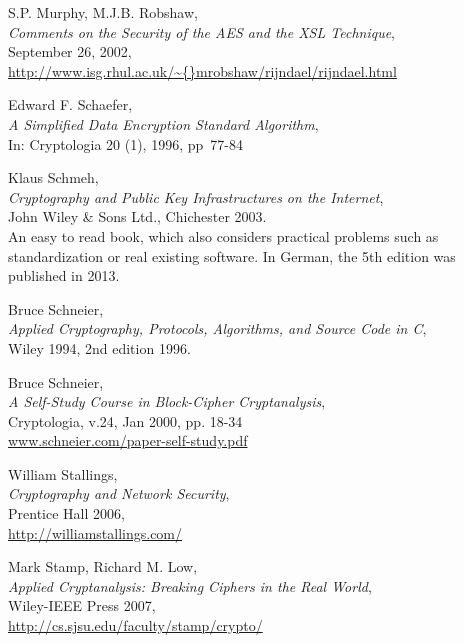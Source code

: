 \begin{thebibliography}{99999}
  
       S.P. Murphy, M.J.B. Robshaw, \\
       {\em Comments on the Security of the AES and the XSL Technique}, \\
       September 26, 2002, \\
       \url{http://www.isg.rhul.ac.uk/\~{}mrobshaw/rijndael/rijndael.html}

  
       Edward F. Schaefer, \\
       {\em A Simplified Data Encryption Standard Algorithm}, \\
       In: Cryptologia 20 (1), 1996, pp~77-84

  
       Klaus Schmeh, \\
       {\em Cryptography and Public Key Infrastructures on the Internet},\\ 
       John Wiley \& Sons Ltd., Chichester 2003. \\
       An easy to read book, which also considers practical
       problems such as standardization or real existing software.
       In German, the 5th edition was published in 2013.

  
       Bruce Schneier, \\
       {\em Applied Cryptography, Protocols, Algorithms, and Source Code in C}, \\
       Wiley 1994, 2nd edition 1996.

  
       Bruce Schneier, \\
       {\em A Self-Study Course in Block-Cipher Cryptanalysis}, \\
       Cryptologia, v.24, Jan 2000, pp. 18-34\\
       \url{www.schneier.com/paper-self-study.pdf}

  
       William Stallings, \\
       {\em Cryptography and Network Security}, \\
       Prentice Hall 2006,\\
       \url{http://williamstallings.com/}

  
       Mark Stamp, Richard M. Low, \\
       {\em Applied Cryptanalysis: Breaking Ciphers in the Real World}, \\
       Wiley-IEEE Press 2007, \\
       \url{http://cs.sjsu.edu/faculty/stamp/crypto/}


\end{thebibliography}

